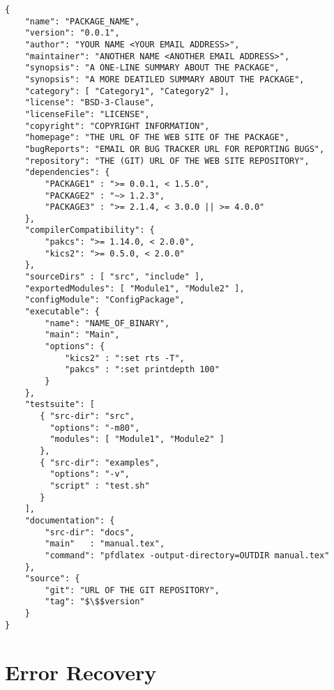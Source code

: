 \documentclass[11pt]{article}
\begin{document}
\begin{lstlisting}
{
    "name": "PACKAGE_NAME",
    "version": "0.0.1",
    "author": "YOUR NAME <YOUR EMAIL ADDRESS>",
    "maintainer": "ANOTHER NAME <ANOTHER EMAIL ADDRESS>",
    "synopsis": "A ONE-LINE SUMMARY ABOUT THE PACKAGE",
    "synopsis": "A MORE DEATILED SUMMARY ABOUT THE PACKAGE",
    "category": [ "Category1", "Category2" ],
    "license": "BSD-3-Clause",
    "licenseFile": "LICENSE",
    "copyright": "COPYRIGHT INFORMATION",
    "homepage": "THE URL OF THE WEB SITE OF THE PACKAGE",
    "bugReports": "EMAIL OR BUG TRACKER URL FOR REPORTING BUGS",
    "repository": "THE (GIT) URL OF THE WEB SITE REPOSITORY",
    "dependencies": {
        "PACKAGE1" : ">= 0.0.1, < 1.5.0",
        "PACKAGE2" : "~> 1.2.3",
        "PACKAGE3" : ">= 2.1.4, < 3.0.0 || >= 4.0.0"
    },
    "compilerCompatibility": {
        "pakcs": ">= 1.14.0, < 2.0.0",
        "kics2": ">= 0.5.0, < 2.0.0"
    },
    "sourceDirs" : [ "src", "include" ],
    "exportedModules": [ "Module1", "Module2" ],
    "configModule": "ConfigPackage",
    "executable": {
        "name": "NAME_OF_BINARY",
        "main": "Main",
        "options": {
            "kics2" : ":set rts -T",
            "pakcs" : ":set printdepth 100"
        }
    },
    "testsuite": [
       { "src-dir": "src",
         "options": "-m80",
         "modules": [ "Module1", "Module2" ]
       },
       { "src-dir": "examples",
         "options": "-v",
         "script" : "test.sh"
       }
    ],
    "documentation": {
        "src-dir": "docs",
        "main"   : "manual.tex",
        "command": "pfdlatex -output-directory=OUTDIR manual.tex"
    },
    "source": {
        "git": "URL OF THE GIT REPOSITORY",
        "tag": "$\$$version"
    }
}
\end{lstlisting}


\section{Error Recovery}
\label{sec:recovery}
\end{document}
